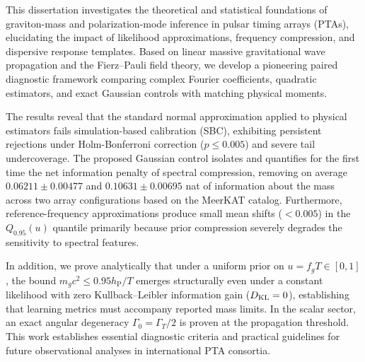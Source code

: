 This dissertation investigates the theoretical and statistical foundations of graviton-mass and polarization-mode inference in pulsar timing arrays (PTAs), elucidating the impact of likelihood approximations, frequency compression, and dispersive response templates. Based on linear massive gravitational wave propagation and the Fierz--Pauli field theory, we develop a pioneering paired diagnostic framework comparing complex Fourier coefficients, quadratic estimators, and exact Gaussian controls with matching physical moments.

The results reveal that the standard normal approximation applied to physical estimators fails simulation-based calibration (SBC), exhibiting persistent rejections under Holm-Bonferroni correction ($p \le 0.005$) and severe tail undercoverage. The proposed Gaussian control isolates and quantifies for the first time the net information penalty of spectral compression, removing on average $0.06211 \pm 0.00477$ and $0.10631 \pm 0.00695$ nat of information about the mass across two array configurations based on the MeerKAT catalog. Furthermore, reference-frequency approximations produce small mean shifts ($< 0.005$) in the $Q_{0.95}(u)$ quantile primarily because prior compression severely degrades the sensitivity to spectral features.

In addition, we prove analytically that under a uniform prior on $u = f_g T \in [0,1]$, the bound $m_g c^2 \le 0.95 h_{\mathrm P}/T$ emerges structurally even under a constant likelihood with zero Kullback--Leibler information gain ($D_{\rm KL} = 0$), establishing that learning metrics must accompany reported mass limits. In the scalar sector, an exact angular degeneracy $\Gamma_0 = \Gamma_T/2$ is proven at the propagation threshold. This work establishes essential diagnostic criteria and practical guidelines for future observational analyses in international PTA consortia.
